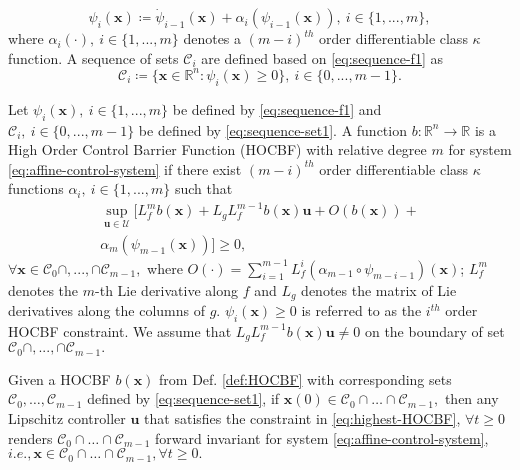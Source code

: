 \begin{equation}
\label{eq:sequence-f1}
\psi_{i}(\boldsymbol{x})\coloneqq\dot{\psi}_{i-1}(\boldsymbol{x})+\alpha_{i}(\psi_{i-1}(\boldsymbol{x})),\ i\in \{1,...,m\}, 
\end{equation}
where $\alpha_{i}(\cdot ),\ i\in \{1,...,m\}$ denotes a $(m-i)^{th}$ order differentiable class $\kappa$ function. A sequence of sets $\mathcal C_{i}$ are defined based on \eqref{eq:sequence-f1} as
\begin{equation}
\label{eq:sequence-set1}
\mathcal C_{i}\coloneqq \{\boldsymbol{x}\in\mathbb{R}^{n}:\psi_{i}(\boldsymbol{x})\ge 0\}, \ i\in \{0,...,m-1\}. 
\end{equation}

\begin{definition}
\label{def:HOCBF}
Let $\psi_{i}(\boldsymbol{x}),\ i\in \{1,...,m\}$ be defined by \eqref{eq:sequence-f1} and $\mathcal C_{i},\ i\in \{0,...,m-1\}$ be defined by \eqref{eq:sequence-set1}. A function $b:\mathbb{R}^{n}\to\mathbb{R}$ is a High Order Control Barrier Function (HOCBF) with relative degree $m$ for system \eqref{eq:affine-control-system} if there exist $(m-i)^{th}$ order differentiable class $\kappa$ functions $\alpha_{i},\ i\in \{1,...,m\}$ such that
\begin{equation}
\label{eq:highest-HOCBF}
\begin{split}
\sup_{\boldsymbol{u}\in \mathcal U}[L_{f}^{m}b(\boldsymbol{x})+L_{g}L_{f}^{m-1}b(\boldsymbol{x})\boldsymbol{u}+O(b(\boldsymbol{x}))
+\\
\alpha_{m}(\psi_{m-1}(\boldsymbol{x}))]\ge 0,
\end{split}
\end{equation}
$\forall \boldsymbol{x}\in \mathcal C_{0}\cap,...,\cap \mathcal C_{m-1},$ where $O(\cdot)=\sum_{i=1}^{m-1}L_{f}^{i}(\alpha_{m-1}\circ\psi_{m-i-1})(\boldsymbol{x})$; $L_{f}^{m}$ denotes the $m$-th Lie derivative along $f$ and $L_{g}$ denotes the matrix of Lie derivatives along the columns of $g$. $\psi_{i}(\boldsymbol{x})\ge0$ is referred to as the $i^{th}$ order HOCBF constraint. We assume that $L_{g}L_{f}^{m-1}b(\boldsymbol{x})\boldsymbol{u}\ne0$ on the boundary of set $\mathcal C_{0}\cap,...,\cap \mathcal C_{m-1}.$ 
\end{definition}

\begin{theorem}
\label{thm:safety-guarantee}
Given a HOCBF $b(\boldsymbol{x})$ from Def. \ref{def:HOCBF} with corresponding sets $\mathcal{C}_{0}, \dots,\mathcal {C}_{m-1}$ defined by \eqref{eq:sequence-set1}, if $\boldsymbol{x}(0) \in \mathcal {C}_{0}\cap \dots \cap \mathcal {C}_{m-1},$ then any Lipschitz controller $\boldsymbol{u}$ that satisfies the constraint in \eqref{eq:highest-HOCBF}, $\forall t\ge 0$ renders $\mathcal {C}_{0}\cap \dots \cap \mathcal {C}_{m-1}$ forward invariant for system \eqref{eq:affine-control-system}, $i.e., \boldsymbol{x} \in \mathcal {C}_{0}\cap \dots \cap \mathcal {C}_{m-1}, \forall t\ge 0.$
\end{theorem}

